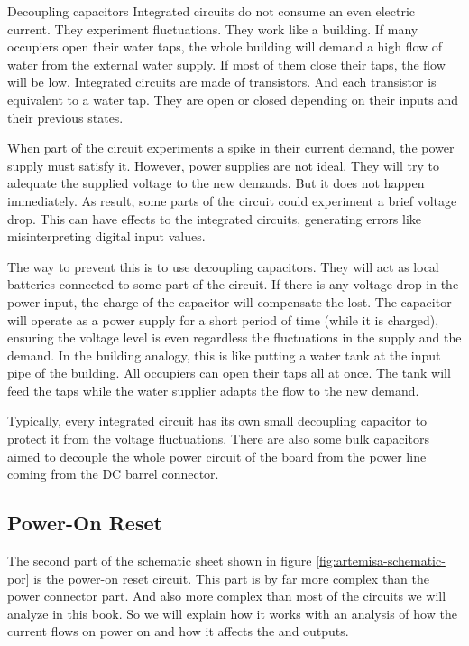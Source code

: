 \begin{theory}{Decoupling capacitors}
  Integrated circuits do not consume an even electric current. They experiment fluctuations. They work like a building. If many occupiers open their water taps, the whole building will demand a high flow of water from the external water supply. If most of them close their taps, the flow will be low. Integrated circuits are made of transistors. And each transistor is equivalent to a water tap. They are open or closed depending on their inputs and their previous states.

  When part of the circuit experiments a spike in their current demand, the power supply must satisfy it. However, power supplies are not ideal. They will try to adequate the supplied voltage to the new demands. But it does not happen immediately. As result, some parts of the circuit could experiment a brief voltage drop. This can have effects to the integrated circuits, generating errors like misinterpreting digital input values.

  The way to prevent this is to use decoupling capacitors. They will act as local batteries connected to some part of the circuit. If there is any voltage drop in the power input, the charge of the capacitor will compensate the lost. The capacitor will operate as a power supply for a short period of time (while it is charged), ensuring the voltage level is even regardless the fluctuations in the supply and the demand. In the building analogy, this is like putting a water tank at the input pipe of the building. All occupiers can open their taps all at once. The tank will feed the taps while the water supplier adapts the flow to the new demand.

  Typically, every integrated circuit has its own small decoupling capacitor to protect it from the voltage fluctuations. There are also some bulk capacitors aimed to decouple the whole power circuit of the board from the power line coming from the DC barrel connector.
\end{theory}

\subsection{Power-On Reset}

The second part of the schematic sheet shown in figure \ref{fig:artemisa-schematic-por} is the power-on reset circuit. This part is by far more complex than the power connector part. And also more complex than most of the circuits we will analyze in this book. So we will explain how it works with an analysis of how the current flows on power on and how it affects the  and  outputs.

